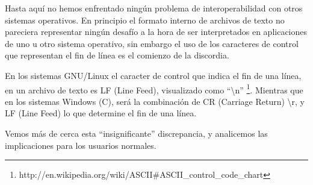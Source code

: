 \documentclass[12pt]{article}
\begin{document}
Hasta aquí no hemos enfrentado ningún problema de interoperabilidad con otros
sistemas operativos. En principio el formato interno de archivos de texto no
pareciera representar ningún desafío a la hora de ser interpretados en
aplicaciones de uno u otro sistema operativo, sin embargo el uso de los
caracteres de control que representan el fin de línea es el comienzo de la
discordia. 

En los sistemas GNU/Linux el caracter de control que indica el fin de una
línea, en un archivo de texto es LF (Line Feed), visualizado como
``\textbackslash n''
\footnote{http://en.wikipedia.org/wiki/ASCII\#ASCII\_control\_code\_chart}.
Mientras que en los sistemas Windows (C), será la combinación de CR (Carriage
Return) \textbackslash r, y LF (Line Feed) lo que determine el fin de una
línea.

Vemos más de cerca esta ``insignificante'' discrepancia, y analicemos las
implicaciones para los usuarios normales. 
\end{document}
